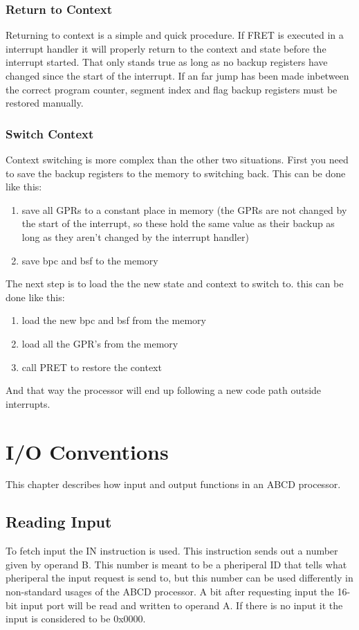 \documentclass[oneside, a4paper]{memoir}
\begin{document}
\subsection{Return to Context}
Returning to context is a simple and quick procedure. If FRET is executed in a interrupt handler it will properly return to the context and state before the interrupt started. That only stands true as long as no backup registers have changed since the start of the interrupt. If an far jump has been made inbetween the correct program counter, segment index and flag backup registers must be restored manually. 
\subsection{Switch Context}
Context switching is more complex than the other two situations. First you need to save the backup registers to the memory to switching back. This can be done like this:
\begin{enumerate}
\item save all GPRs to a constant place in memory (the GPRs are not changed by the start of the interrupt, so these hold the same value as their backup as long as they aren't changed by the interrupt handler)
\item save bpc and bsf to the memory
\end{enumerate}
The next step is to load the the new state and context to switch to. this can be done like this:
\begin{enumerate}
\item load the new bpc and bsf from the memory
\item load all the GPR's from the memory
\item call PRET to restore the context
\end{enumerate}
And that way the processor will end up following a new code path outside interrupts.

\chapter{I/O Conventions}
\label{ch:I/O Conventions}
This chapter describes how input and output functions in an ABCD processor.
\section{Reading Input}
To fetch input the IN instruction is used. This instruction sends out a number given by operand B. This number is meant to be a pheriperal ID that tells what pheriperal the input request is send to, but this number can be used differently in non-standard usages of the ABCD processor. A bit after requesting input the 16-bit input port will be read and written to operand A. If there is no input it the input is considered to be 0x0000. 
\end{document}
